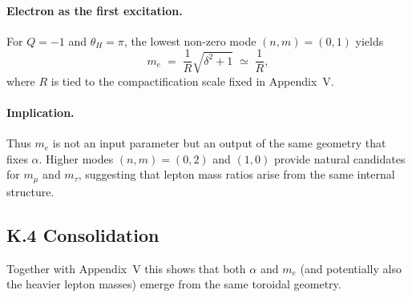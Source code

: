 \paragraph{Electron as the first excitation.}
For $Q=-1$ and $\theta_H=\pi$, the lowest non-zero mode $(n,m)=(0,1)$ yields 
\begin{equation}
m_e \;=\; \frac{1}{R}\sqrt{\delta^2+1}\;\simeq\;\frac{1}{R},
\end{equation}
where $R$ is tied to the compactification scale fixed in Appendix~V. 

\paragraph{Implication.}
Thus $m_e$ is not an input parameter but an output of the same geometry that 
fixes $\alpha$. Higher modes $(n,m)=(0,2)$ and $(1,0)$ provide natural 
candidates for $m_\mu$ and $m_\tau$, suggesting that lepton mass ratios arise 
from the same internal structure.

\subsection*{K.4 Consolidation}
Together with Appendix~V this shows that both $\alpha$ and $m_e$ 
(and potentially also the heavier lepton masses) emerge from the same 
toroidal geometry.
